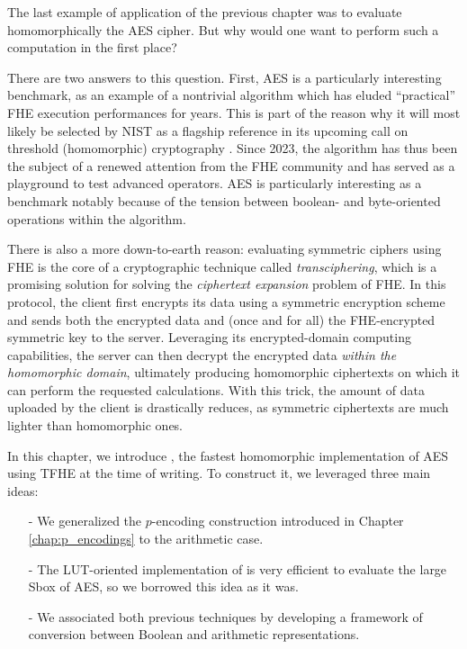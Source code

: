 The last example of application of the previous chapter was to evaluate homomorphically the AES cipher.  But why would one want to perform such a computation in the first place?

There are two answers to this question. First,  AES is a particularly interesting benchmark, as an example of a nontrivial algorithm which has eluded ``practical'' FHE execution performances for years. This is part of the reason why it will most likely be selected by NIST as a flagship reference in its upcoming call on threshold (homomorphic) cryptography \cite{call_nist}. Since 2023, the algorithm has thus been the subject of a renewed attention from the FHE community and has served as a playground to test advanced operators\cite{DBLP:conf/wahc/TramaCBS23, ISC:WWLLL23, TCHES:BonPoiRiv24, TCHES:WLWLLW24}. AES is particularly interesting as a benchmark notably because of the tension between boolean- and byte-oriented operations within the algorithm.


There is also a more down-to-earth reason: evaluating symmetric ciphers using FHE is the core of a cryptographic technique called \textit{transciphering}, which is a promising solution for solving the \textit{ciphertext expansion} problem of FHE. In this protocol, the client first encrypts its data using a symmetric encryption scheme and sends both the encrypted data and (once and for all) the FHE-encrypted symmetric key to the server. Leveraging its encrypted-domain computing capabilities, the server can then decrypt the encrypted data \emph{within the homomorphic domain}, ultimately producing homomorphic ciphertexts on which it can perform the requested calculations. With this trick, the amount of data uploaded by the client is drastically reduces, as symmetric ciphertexts are much lighter than homomorphic ones.


In this chapter, we introduce \hippo, the fastest homomorphic implementation of AES using TFHE at the time of writing. To construct it, we leveraged three main ideas:

\begin{itemize}
	\item[-] We generalized the $p$-encoding construction introduced in Chapter \ref{chap:p_encodings} to the arithmetic case.
	\item[-] The LUT-oriented implementation of \cite{DBLP:conf/wahc/TramaCBS23} is very efficient to evaluate the large Sbox of AES, so we borrowed this idea as it was.
	\item[-] We associated both previous techniques by developing a framework of conversion between Boolean and arithmetic representations.
\end{itemize}


